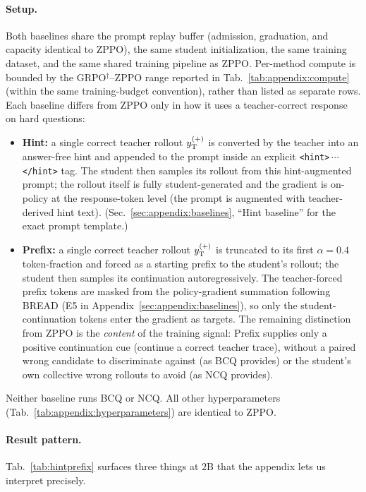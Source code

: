 \paragraph{Setup.}
Both baselines share the prompt replay buffer (admission, graduation, and capacity identical to ZPPO), the same student initialization, the same training dataset, and the same shared training pipeline as ZPPO. Per-method compute is bounded by the GRPO$^{\dagger}$--ZPPO range reported in Tab.~\ref{tab:appendix:compute} (within the same training-budget convention), rather than listed as separate rows. Each baseline differs from ZPPO only in how it uses a teacher-correct response on hard questions:
\begin{itemize}[leftmargin=12pt,topsep=2pt,itemsep=2pt]
    \item \textbf{Hint:} a single correct teacher rollout $y_{\rm T}^{(+)}$ is converted by the teacher into an answer-free hint and appended to the prompt inside an explicit \texttt{<hint>}\,$\cdots$\,\texttt{</hint>} tag. The student then samples its rollout from this hint-augmented prompt; the rollout itself is fully student-generated and the gradient is on-policy at the response-token level (the prompt is augmented with teacher-derived hint text). (Sec.~\ref{sec:appendix:baselines}, ``Hint baseline'' for the exact prompt template.)
    \item \textbf{Prefix:} a single correct teacher rollout $y_{\rm T}^{(+)}$ is truncated to its first $\alpha\!=\!0.4$ token-fraction and forced as a starting prefix to the student's rollout; the student then samples its continuation autoregressively. The teacher-forced prefix tokens are masked from the policy-gradient summation following BREAD (E5 in Appendix~\ref{sec:appendix:baselines}), so only the student-continuation tokens enter the gradient as targets. The remaining distinction from ZPPO is the \emph{content} of the training signal: Prefix supplies only a positive continuation cue (continue a correct teacher trace), without a paired wrong candidate to discriminate against (as BCQ provides) or the student's own collective wrong rollouts to avoid (as NCQ provides).
\end{itemize}
Neither baseline runs BCQ or NCQ. All other hyperparameters (Tab.~\ref{tab:appendix:hyperparameters}) are identical to ZPPO.

\paragraph{Result pattern.}
Tab.~\ref{tab:hintprefix} surfaces three things at $2$B that the appendix lets us interpret precisely.

